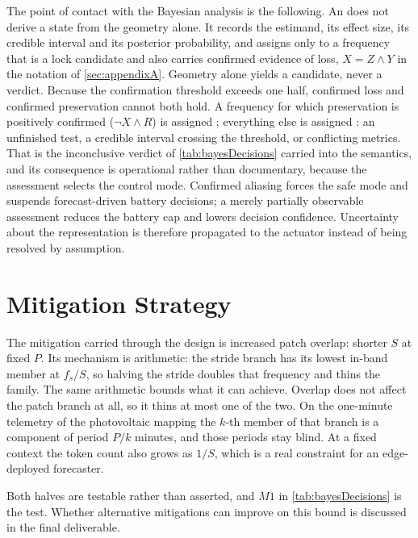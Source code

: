 The point of contact with the Bayesian analysis is the following. An  does not derive a state from the geometry alone. It records the estimand, its effect size, its credible interval and its posterior probability, and assigns  only to a frequency that is a lock candidate and also carries confirmed evidence of loss, $X = Z \wedge Y$ in the notation of \autoref{sec:appendixA}. Geometry alone yields a candidate, never a verdict. Because the confirmation threshold exceeds one half, confirmed loss and confirmed preservation cannot both hold. A frequency for which preservation is positively confirmed ($\neg X \wedge R$) is assigned ; everything else is assigned : an unfinished test, a credible interval crossing the threshold, or conflicting metrics. That is the inconclusive verdict of \autoref{tab:bayesDecisions} carried into the semantics, and its consequence is operational rather than documentary, because the assessment selects the control mode. Confirmed aliasing forces the safe mode and suspends forecast-driven battery decisions; a merely partially observable assessment reduces the battery cap and lowers decision confidence. Uncertainty about the representation is therefore propagated to the actuator instead of being resolved by assumption.

\section{Mitigation Strategy}
\label{sec:mitigation}

The mitigation carried through the design is increased patch overlap: shorter $S$ at fixed $P$. Its mechanism is arithmetic: the stride branch has its lowest in-band member at $f_s/S$, so halving the stride doubles that frequency and thins the family. The same arithmetic bounds what it can achieve. Overlap does not affect the patch branch at all, so it thins at most one of the two. On the one-minute telemetry of the photovoltaic mapping the $k$-th member of that branch is a component of period $P/k$ minutes, and those periods stay blind. At a fixed context the token count also grows as $1/S$, which is a real constraint for an edge-deployed forecaster.

Both halves are testable rather than asserted, and $M1$ in \autoref{tab:bayesDecisions} is the test. Whether alternative mitigations can improve on this bound is discussed in the final deliverable.

